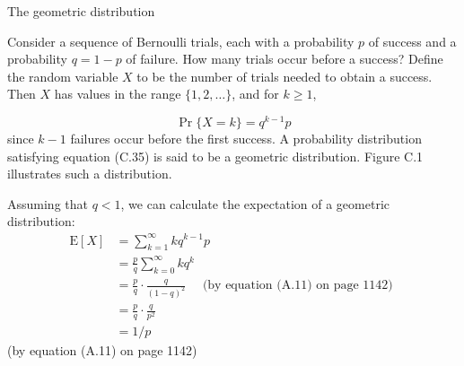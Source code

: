 \documentclass[lang=cn,newtx,10pt,scheme=chinese]{elegantbook}
\begin{document}
The geometric distribution

Consider a sequence of Bernoulli trials, each with a probability $p$ of success and a probability $q=1-p$ of failure. How many trials occur before a success? Define the random variable $X$ to be the number of trials needed to obtain a success. Then $X$ has values in the range $\{1,2, \ldots\}$, and for $k \geq 1$,

$$
\operatorname{Pr}\{X=k\}=q^{k-1} p
$$
since $k-1$ failures occur before the first success. A probability distribution satisfying equation (C.35) is said to be a geometric distribution. Figure C.1 illustrates such a distribution.

Assuming that $q<1$, we can calculate the expectation of a geometric distribution:
$$
\begin{aligned}
\mathrm{E}[X] & =\sum_{k=1}^{\infty} k q^{k-1} p \\
& =\frac{p}{q} \sum_{k=0}^{\infty} k q^k \\
& =\frac{p}{q} \cdot \frac{q}{(1-q)^2} \quad \text { (by equation (A.11) on page 1142) } \\
& =\frac{p}{q} \cdot \frac{q}{p^2} \\
& =1 / p
\end{aligned}
$$
(by equation (A.11) on page 1142)
\end{document}
